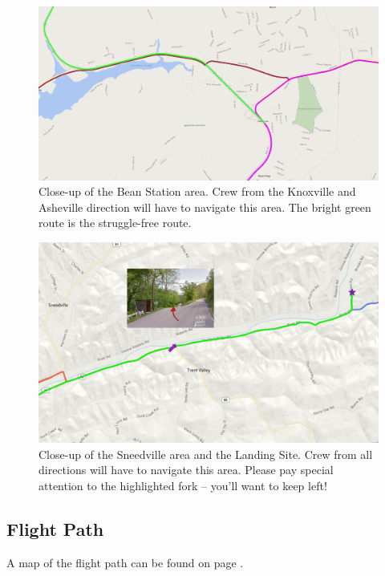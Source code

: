 \begin{figure}[H]
\centering
\includegraphics[width=.9\textwidth]{images/overviewBeanStation.png}
\caption{Close-up of the Bean Station area. Crew from the Knoxville and Asheville direction will have to navigate this area. The bright green route is the struggle-free route.}
\label{image:beanstation}
\end{figure}
\vfill
\begin{figure}[H]
\centering
\includegraphics[width=.9\textwidth]{images/overviewTTMSite.png}
\caption{Close-up of the Sneedville area and the Landing Site. Crew from all directions will have to navigate this area. Please pay special attention to the highlighted fork -- you'll want to keep left!}
\label{image:sneedville}
\end{figure}

\subsection*{Flight Path}
A map of the flight path can be found on page \pageref{image:overviewmap}.

